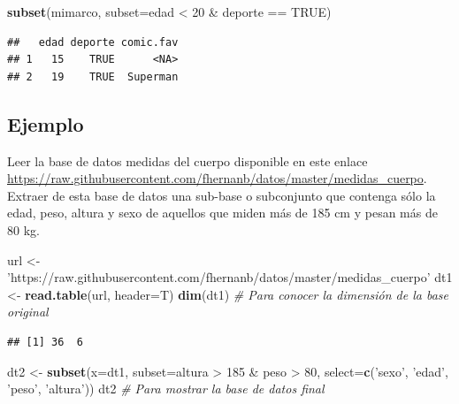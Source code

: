 \documentclass[10pt,]{krantz}
\makeatletter
\newenvironment{Shaded}{\begin{snugshade}}{\end{snugshade}}
\newcommand{\KeywordTok}[1]{\textcolor[rgb]{0.13,0.29,0.53}{\textbf{{#1}}}}
\newcommand{\DataTypeTok}[1]{\textcolor[rgb]{0.13,0.29,0.53}{{#1}}}
\newcommand{\DecValTok}[1]{\textcolor[rgb]{0.00,0.00,0.81}{{#1}}}
\newcommand{\StringTok}[1]{\textcolor[rgb]{0.31,0.60,0.02}{{#1}}}
\newcommand{\CommentTok}[1]{\textcolor[rgb]{0.56,0.35,0.01}{\textit{{#1}}}}
\newcommand{\OtherTok}[1]{\textcolor[rgb]{0.56,0.35,0.01}{{#1}}}
\newcommand{\NormalTok}[1]{{#1}}
\newenvironment{kframe}{%
\medskip{}
\setlength{\fboxsep}{.8em}
 \def\at@end@of@kframe{}%
 \ifinner\ifhmode%
  \def\at@end@of@kframe{\end{minipage}}%
  \begin{minipage}{\columnwidth}%
 \fi\fi%
 \def\FrameCommand##1{\hskip\@totalleftmargin \hskip-\fboxsep
 \colorbox{shadecolor}{##1}\hskip-\fboxsep
     \hskip-\linewidth \hskip-\@totalleftmargin \hskip\columnwidth}%
 \MakeFramed {\advance\hsize-\width
   \@totalleftmargin\z@ \linewidth\hsize
   \@setminipage}}%
 {\par\unskip\endMakeFramed%
 \at@end@of@kframe}
\renewenvironment{Shaded}{\begin{kframe}}{\end{kframe}}
\makeatother
\begin{document}
\begin{Shaded}
\begin{Highlighting}[]
\KeywordTok{subset}\NormalTok{(mimarco, }\DataTypeTok{subset=}\NormalTok{edad <}\StringTok{ }\DecValTok{20} \NormalTok{&}\StringTok{ }\NormalTok{deporte ==}\StringTok{ }\OtherTok{TRUE}\NormalTok{)}
\end{Highlighting}
\end{Shaded}

\begin{verbatim}
##   edad deporte comic.fav
## 1   15    TRUE      <NA>
## 2   19    TRUE  Superman
\end{verbatim}

\subsection*{Ejemplo}\label{ejemplo-4}


Leer la base de datos medidas del cuerpo disponible en este enlace
\url{https://raw.githubusercontent.com/fhernanb/datos/master/medidas_cuerpo}.
Extraer de esta base de datos una sub-base o subconjunto que contenga
sólo la edad, peso, altura y sexo de aquellos que miden más de 185 cm y
pesan más de 80 kg.

\begin{Shaded}
\begin{Highlighting}[]
\NormalTok{url <-}\StringTok{ 'https://raw.githubusercontent.com/fhernanb/datos/master/medidas_cuerpo'}
\NormalTok{dt1 <-}\StringTok{ }\KeywordTok{read.table}\NormalTok{(url, }\DataTypeTok{header=}\NormalTok{T)}
\KeywordTok{dim}\NormalTok{(dt1)  }\CommentTok{# Para conocer la dimensión de la base original}
\end{Highlighting}
\end{Shaded}

\begin{verbatim}
## [1] 36  6
\end{verbatim}

\begin{Shaded}
\begin{Highlighting}[]
\NormalTok{dt2 <-}\StringTok{ }\KeywordTok{subset}\NormalTok{(}\DataTypeTok{x=}\NormalTok{dt1, }\DataTypeTok{subset=}\NormalTok{altura >}\StringTok{ }\DecValTok{185} \NormalTok{&}\StringTok{ }\NormalTok{peso >}\StringTok{ }\DecValTok{80}\NormalTok{,}
              \DataTypeTok{select=}\KeywordTok{c}\NormalTok{(}\StringTok{'sexo'}\NormalTok{, }\StringTok{'edad'}\NormalTok{, }\StringTok{'peso'}\NormalTok{, }\StringTok{'altura'}\NormalTok{))}
\NormalTok{dt2  }\CommentTok{# Para mostrar la base de datos final}
\end{Highlighting}
\end{Shaded}
\end{document}
